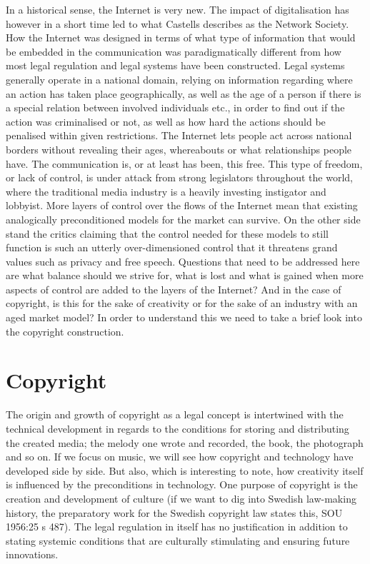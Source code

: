 In a historical sense, the Internet is very new. The impact of digitalisation
has however in a short time led to what Castells describes as the Network
Society. How the Internet was designed in terms of what type of information that
would be embedded in the communication was paradigmatically dif\hbox{}ferent from how
most legal regulation and legal systems have been constructed. Legal systems
generally operate in a national domain, relying on information regarding where
an action has taken place geographically, as well as the age of a person if
there is a special relation between involved individuals etc., in order to f\hbox{}ind
out if the action was criminalised or not, as well as how hard the actions
should be penalised within given restrictions. The Internet lets people act
across national borders without revealing their ages, whereabouts or what
relationships people have. The communication is, or at least has been, this
free. This type of freedom, or lack of control, is under attack from strong
legislators throughout the world, where the traditional media industry is a
heavily investing instigator and lobbyist. More layers of control over the f\hbox{}lows
of the Internet mean that existing analogically preconditioned models for the
market can survive. On the other side stand the critics claiming that the
control needed for these models to still function is such an utterly
over-dimensioned control that it threatens grand values such as privacy and free
speech. Questions that need to be addressed here are what balance should we
strive for, what is lost and what is gained when more aspects of control are
added to the layers of the Internet? And in the case of copyright, is this for
the sake of creativity or for the sake of an industry with an aged market model?
In order to understand this we need to take a brief look into the copyright
construction.


\section{Copyright}
\label{s:darling_conceptions:copyright}

The origin and growth of copyright as a legal concept is intertwined with the
technical development in regards to the conditions for storing and distributing
the created media; the melody one wrote and recorded, the book, the photograph
and so on. If we focus on music, we will see how copyright and technology have
developed side by side. But also, which is interesting to note, how creativity
itself is inf\hbox{}luenced by the preconditions in technology. One purpose of
copyright is the creation and development of culture (if we want to dig into
Swedish law-making history, the preparatory work for the Swedish copyright law
states this, SOU 1956:25 s 487). The legal regulation in itself has no
justif\hbox{}ication in addition to stating systemic conditions that are culturally
stimulating and ensuring future innovations.

